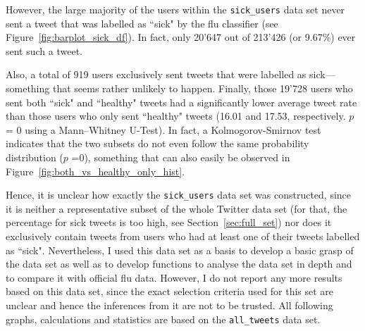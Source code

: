 \documentclass[11pt, a4paper,twoside]{report}\usepackage[]{graphicx}\usepackage[]{color}
\begin{document}
However, the large majority of the users within the \texttt{sick\_users} data set never sent a tweet that was labelled as ``sick" by the flu classifier (see Figure~\ref{fig:barplot_sick_df}). In fact, only 20'647 out of 213'426 (or 9.67\%) ever sent such a tweet.

Also, a total of 919 users exclusively sent tweets that were labelled as sick---something that seems rather unlikely to happen. Finally, those 19'728 users who sent both ``sick" and ``healthy" tweets had a significantly lower average tweet rate than those users who only sent ``healthy" tweets (16.01 and 17.53, respectively. $p$ = 0 using a Mann--Whitney U-Test). In fact, a Kolmogorov-Smirnov test indicates that the two subsets do not even follow the same probability distribution ($p$ =0), something that can also easily be observed in Figure~\ref{fig:both_vs_healthy_only_hist}.

Hence, it is unclear how exactly the \texttt{sick\_users} data set was constructed, since it is neither a representative subset of the whole Twitter data set (for that, the percentage for sick tweets is too high, see Section~\ref{sec:full_set}) nor does it exclusively contain tweets from users who had at least one of their tweets labelled as ``sick". Nevertheless, I used this data set as a basis to develop a basic grasp of the data set as well as to develop functions to analyse the data set in depth and to compare it with official flu data. However, I do not report any more results based on this data set, since the exact selection criteria used for this set are unclear and hence the inferences from it are not to be trusted. All following graphs, calculations and statistics are based on the \texttt{all\_tweets} data set.\clearpage
\end{document}
